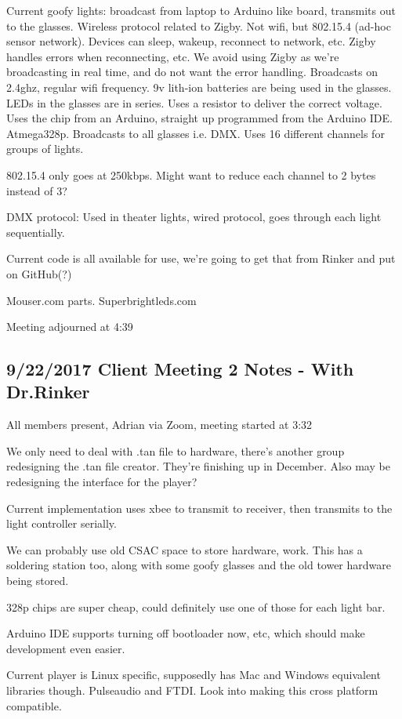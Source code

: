 \documentclass[12pt]{article}
\begin{document}
Current goofy lights: broadcast from laptop to Arduino like board, transmits out to the glasses. Wireless protocol related to Zigby. Not wifi, but 802.15.4 (ad-hoc sensor network). Devices can sleep, wakeup, reconnect to network, etc. Zigby handles errors when reconnecting, etc. We avoid using Zigby as we’re broadcasting in real time, and do not want the error handling. Broadcasts on 2.4ghz, regular wifi frequency. 9v lith-ion batteries are being used in the glasses. LEDs in the glasses are in series. Uses a resistor to deliver the correct voltage. Uses the chip from an Arduino, straight up programmed from the Arduino IDE. Atmega328p. Broadcasts to all glasses i.e. DMX. Uses 16 different channels for groups of lights.

802.15.4 only goes at 250kbps. Might want to reduce each channel to 2 bytes instead of 3?

DMX protocol: Used in theater lights, wired protocol, goes through each light sequentially.

Current code is all available for use, we're going to get that from Rinker and put on GitHub(?)

Mouser.com parts. Superbrightleds.com	

Meeting adjourned at 4:39

	\clearpage
	\subsection{9/22/2017 Client Meeting 2 Notes - With Dr.Rinker}
	All members present, Adrian via Zoom, meeting started at 3:32

We only need to deal with .tan file to hardware, there’s another group redesigning the .tan file creator. They’re finishing up in December. Also may be redesigning the interface for the player?

Current implementation uses xbee to transmit to receiver, then transmits to the light controller serially. 

We can probably use old CSAC space to store hardware, work. This has a soldering station too, along with some goofy glasses and the old tower hardware being stored. 

328p chips are super cheap, could definitely use one of those for each light bar. 

Arduino IDE supports turning off bootloader now, etc, which should make development even easier. 

Current player is Linux specific, supposedly has Mac and Windows equivalent libraries though. Pulseaudio and FTDI. Look into making this cross platform compatible.
\end{document}
